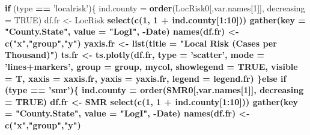 \documentclass[]{book}
\newenvironment{Shaded}{\begin{snugshade}}{\end{snugshade}}
\newcommand{\KeywordTok}[1]{\textcolor[rgb]{0.13,0.29,0.53}{\textbf{#1}}}
\newcommand{\DataTypeTok}[1]{\textcolor[rgb]{0.13,0.29,0.53}{#1}}
\newcommand{\DecValTok}[1]{\textcolor[rgb]{0.00,0.00,0.81}{#1}}
\newcommand{\StringTok}[1]{\textcolor[rgb]{0.31,0.60,0.02}{#1}}
\newcommand{\OtherTok}[1]{\textcolor[rgb]{0.56,0.35,0.01}{#1}}
\newcommand{\ControlFlowTok}[1]{\textcolor[rgb]{0.13,0.29,0.53}{\textbf{#1}}}
\newcommand{\OperatorTok}[1]{\textcolor[rgb]{0.81,0.36,0.00}{\textbf{#1}}}
\newcommand{\NormalTok}[1]{#1}
\begin{document}
\begin{Shaded}
\begin{Highlighting}[]
{{{{{{{{{  \ControlFlowTok{if}\NormalTok{ (type }\OperatorTok{==}\StringTok{ 'localrisk'}\NormalTok{)\{}
\NormalTok{    ind.county =}\StringTok{ }\KeywordTok{order}\NormalTok{(LocRisk0[,var.names[}\DecValTok{1}\NormalTok{]], }\DataTypeTok{decreasing =} \OtherTok{TRUE}\NormalTok{)}
\NormalTok{    df.fr <-}\StringTok{ }\NormalTok{LocRisk }\OperatorTok{%
\StringTok{      }\KeywordTok{select}\NormalTok{(}\KeywordTok{c}\NormalTok{(}\DecValTok{1}\NormalTok{, }\DecValTok{1} \OperatorTok{+}\StringTok{ }\NormalTok{ind.county[}\DecValTok{1}\OperatorTok{:}\DecValTok{10}\NormalTok{])) }\OperatorTok{%
\StringTok{      }\KeywordTok{gather}\NormalTok{(}\DataTypeTok{key =} \StringTok{"County.State"}\NormalTok{, }\DataTypeTok{value =} \StringTok{"LogI"}\NormalTok{, }\OperatorTok{-}\NormalTok{Date)}
    \KeywordTok{names}\NormalTok{(df.fr) <-}\StringTok{ }\KeywordTok{c}\NormalTok{(}\StringTok{"x"}\NormalTok{,}\StringTok{"group"}\NormalTok{,}\StringTok{"y"}\NormalTok{)}
\NormalTok{    yaxis.fr <-}\StringTok{ }\KeywordTok{list}\NormalTok{(}\DataTypeTok{title =} \StringTok{"Local Risk (Cases per Thousand)"}\NormalTok{)}
\NormalTok{    ts.fr <-}\StringTok{ }\KeywordTok{ts.plotly}\NormalTok{(df.fr, }\DataTypeTok{type =} \StringTok{'scatter'}\NormalTok{, }
                       \DataTypeTok{mode =} \StringTok{'lines+markers'}\NormalTok{,}
                       \DataTypeTok{group =}\NormalTok{ group, mycol, }
                       \DataTypeTok{showlegend =} \OtherTok{TRUE}\NormalTok{, }\DataTypeTok{visible =}\NormalTok{ T,}
                       \DataTypeTok{xaxis =}\NormalTok{ xaxis.fr, }\DataTypeTok{yaxis =}\NormalTok{ yaxis.fr, }
                       \DataTypeTok{legend =}\NormalTok{ legend.fr)}
\NormalTok{  \}}\ControlFlowTok{else} \ControlFlowTok{if}\NormalTok{ (type }\OperatorTok{==}\StringTok{ 'smr'}\NormalTok{)\{}
\NormalTok{    ind.county =}\StringTok{ }\KeywordTok{order}\NormalTok{(SMR0[,var.names[}\DecValTok{1}\NormalTok{]], }\DataTypeTok{decreasing =} \OtherTok{TRUE}\NormalTok{)}
\NormalTok{    df.fr <-}\StringTok{ }\NormalTok{SMR }\OperatorTok{%
\StringTok{      }\KeywordTok{select}\NormalTok{(}\KeywordTok{c}\NormalTok{(}\DecValTok{1}\NormalTok{, }\DecValTok{1} \OperatorTok{+}\StringTok{ }\NormalTok{ind.county[}\DecValTok{1}\OperatorTok{:}\DecValTok{10}\NormalTok{])) }\OperatorTok{%
\StringTok{      }\KeywordTok{gather}\NormalTok{(}\DataTypeTok{key =} \StringTok{"County.State"}\NormalTok{, }\DataTypeTok{value =} \StringTok{"LogI"}\NormalTok{, }\OperatorTok{-}\NormalTok{Date)}
    \KeywordTok{names}\NormalTok{(df.fr) <-}\StringTok{ }\KeywordTok{c}\NormalTok{(}\StringTok{"x"}\NormalTok{,}\StringTok{"group"}\NormalTok{,}\StringTok{"y"}\NormalTok{)}
}}}}}}}}}}}}}
\end{Highlighting}
\end{Shaded}
\end{document}
